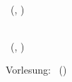 \hypersetup{pdftitle = \titel}
\ifdefined\layoutanon
\hypersetup{pdfauthor = Anonymous}
\else
\hypersetup{pdfauthor = \autor}
\fi




\ifdefined\layouttinyheader
\begin{small}
\noindent \meta \\ \autor\ (\matrikelnummer, \email) \\ \datum
\end{small}
\vspace{0.5cm}
\fi

\ifdefined\layoutsmallheader
\begin{small}
\noindent \meta \\ \autor\ (\matrikelnummer, \email)
\end{small}
\vskip 1.0cm
\begin{center}\begin{Large}\titel\end{Large}\end{center}
\vskip 0.5cm
\fi

\ifdefined\layouttitle
\begin{center}
{%
    \scshape\Large\onehalfspacing
    \titel \par}
\end{center}
\vskip 0.5cm
\fi

\ifdefined\layoutzettel
\pagestyle{empty}
\newcommand{\header}{Vorlesung: \vorlesung \hfill  \autor \, (\matrikelnummer)\\ \zettel \hfill \gruppe \\ \datum}
\header
\fi

